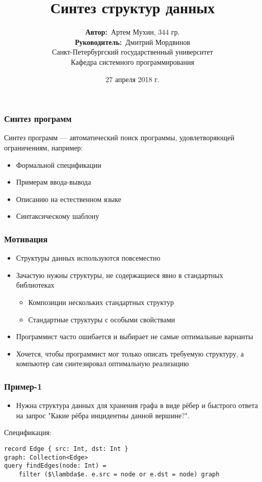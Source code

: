 \documentclass[14pt]{beamer}
\title{\small{Синтез структур данных}}
\author{\small{%
\textbf{Автор:}~Артем Мухин, 344 гр.\\%
\textbf{Руководитель:}~Дмитрий Мордвинов}\\%
\vspace{30pt}%
Санкт-Петербургский государственный университет \\
Кафедра системного программирования
\vspace{20pt}%
}
\date{\small{27 апреля 2018 г.}}
\begin{document}
\maketitle

\begin{frame}
\frametitle{Синтез программ}
Синтез программ --- автоматический поиск программы, удовлетворяющей ограничениям, например:
\begin{itemize}
    \item Формальной спецификации
    \item Примерам ввода-вывода
    \item Описанию на естественном языке
    \item Синтаксическому шаблону
\end{itemize}
\end{frame}

\begin{frame}
\frametitle{Мотивация}
\begin{itemize}
    \item Структуры данных используются повсеместно
    \item Зачастую нужны структуры, не содержащиеся явно в стандартных библиотеках
    \begin{itemize}
        \item Композиции нескольких стандартных структур
        \item Стандартные структуры с особыми свойствами
    \end{itemize}
    \item Программист часто ошибается и выбирает не самые оптимальные варианты
    \item Хочется, чтобы программист мог только описать требуемую структуру,
    а компьютер сам синтезировал оптимальную реализацию
\end{itemize}
\end{frame}


\begin{frame}[fragile]
\frametitle{Пример-1}
\begin{itemize}
  \item Нужна структура данных для хранения графа в виде рёбер и быстрого ответа на запрос "Какие рёбра инцидентны данной вершине?".
\end{itemize}
Спецификация:
\begin{lstlisting}[mathescape=true]
record Edge { src: Int, dst: Int }
graph: Collection<Edge>
query findEdges(node: Int) =
    filter ($\lambda$e. e.src = node or e.dst = node) graph
\end{lstlisting}
\end{frame}
\end{document}
